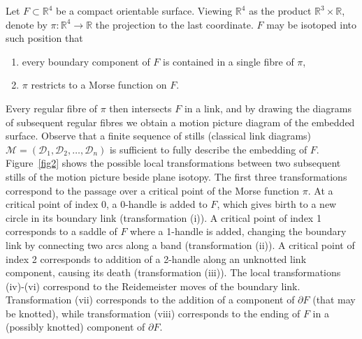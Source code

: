 \documentclass[a4paper,12pt]{amsart}
\numberwithin{equation}{section}
\theoremstyle{plain}
\theoremstyle{definition}
\newcommand{\RR}{\mathbb{R}}
\begin{document}
Let $F\subset \RR ^{4}$ be a compact orientable surface. 
Viewing $\RR ^{4}$ as the product $\RR ^{3}\times \RR $, denote by $\pi \colon \RR ^{4}\to \RR $ the projection to the last coordinate. 
$F$ may be isotoped into such position that
\begin{enumerate}
	\item every boundary component of $F$ is contained in a single fibre of $\pi $,
	\item $\pi $ restricts to a Morse function on $F$. 
\end{enumerate}


Every regular fibre of $\pi $ then intersects $F$ in a link, and by drawing the diagrams of subsequent regular fibres we obtain a motion picture diagram of the embedded surface. 
Observe that a finite sequence of stills (classical link diagrams) $\mathcal{M}=(\mathcal{D}_{1},\mathcal{D}_{2},\ldots ,\mathcal{D}_{n})$ is sufficient to fully describe the embedding of $F$.
Figure~\ref{fig2} shows the possible local transformations between two subsequent stills of the motion picture beside plane isotopy.
The first three transformations correspond to the passage over a critical point of the Morse function $\pi$. 
At a critical point of index 0, a 0-handle is added to $F$, which gives birth to a new circle in its boundary link (transformation (i)).
A critical point of index 1 corresponds to a saddle of $F$ where a 1-handle is added, changing the boundary link by connecting two arcs along a band (transformation (ii)). 
A critical point of index 2 corresponds to addition of a 2-handle along an unknotted link component, causing its death (transformation (iii)). 
The local transformations (iv)-(vi) correspond to the Reidemeister moves of the boundary link. 
Transformation (vii) corresponds to the addition of a component of $\partial F$ (that may be knotted), while transformation (viii) corresponds to the ending of $F$ in a (possibly knotted) component of $\partial F$.  
\end{document}
